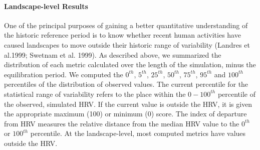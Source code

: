 \paragraph{Landscape-level Results}
One of the principal purposes of gaining a better quantitative understanding of the historic reference period is to know whether recent human activities have caused landscapes to move outside their historic range of variability (Landres et al.1999; Swetnam et al. 1999). As described above, we summarized the distribution of each metric calculated over the length of the simulation, minus the equilibration period. We computed the $0^{th}$, $5^{th}$, $25^{th}$, $50^{th}$, $75^{th}$, $95^{th}$ and $100^{th}$ percentiles of the distribution of observed values. The current percentile for the statistical range of variability refers to the place within the $0-100^{th}$ percentile of the observed, simulated HRV. If the current value is outside the HRV, it is given the appropriate maximum (100) or minimum (0) score. The index of departure from HRV measures the relative distance from the median HRV value to the $0^{th}$ or $100^{th}$ percentile. At the landscape-level, most computed metrics have values outside the HRV. 

